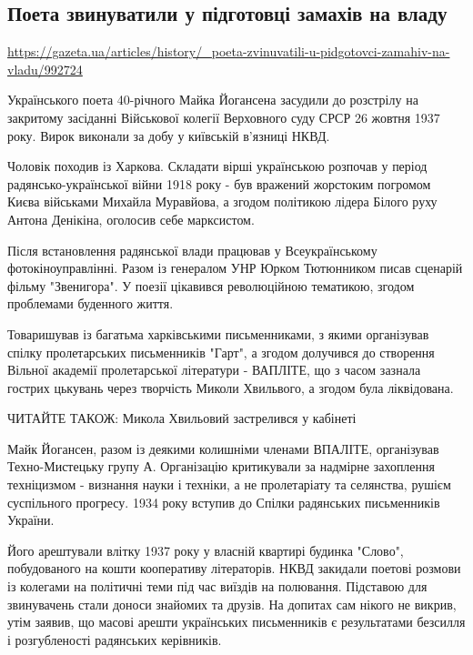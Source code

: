  
 

\subsection{Поета звинуватили у підготовці замахів на владу}

\url{https://gazeta.ua/articles/history/_poeta-zvinuvatili-u-pidgotovci-zamahiv-na-vladu/992724}

Українського поета 40-річного Майка Йогансена засудили до розстрілу на
закритому засіданні Військової колегії Верховного суду СРСР 26 жовтня 1937
року. Вирок виконали за добу у київській в'язниці НКВД.

Чоловік походив із Харкова. Складати вірші українською розпочав у період
радянсько-української війни 1918 року - був вражений жорстоким погромом Києва
військами Михайла Муравйова, а згодом політикою лідера Білого руху Антона
Денікіна, оголосив себе марксистом.

Після встановлення радянської влади працював у Всеукраїнському
фотокіноуправлінні. Разом із генералом УНР Юрком Тютюнником писав сценарій
фільму "Звенигора". У поезії цікавився революційною тематикою, згодом
проблемами буденного життя.

Товаришував із багатьма харківськими письменниками, з якими організував спілку
пролетарських письменників "Гарт", а згодом долучився до створення Вільної
академії пролетарської літератури - ВАПЛІТЕ, що з часом зазнала гострих
цькувань через творчість Миколи Хвильвого, а згодом була ліквідована.

ЧИТАЙТЕ ТАКОЖ: Микола Хвильовий застрелився у кабінеті

Майк Йогансен, разом із деякими колишніми членами ВПАЛІТЕ, організував
Техно-Мистецьку групу А. Організацію критикували за надмірне захоплення
техніцизмом - визнання науки і техніки, а не пролетаріату та селянства, рушієм
суспільного прогресу. 1934 року вступив до Спілки радянських письменників
України.

Його арештували влітку 1937 року у власній квартирі будинка "Слово",
побудованого на кошти кооперативу літераторів. НКВД закидали поетові розмови із
колегами на політичні теми під час виїздів на полювання. Підставою для
звинувачень стали доноси знайомих та друзів. На допитах сам нікого не викрив,
утім заявив, що масові арешти українських письменників є результатами безсилля
і розгубленості радянських керівників.

